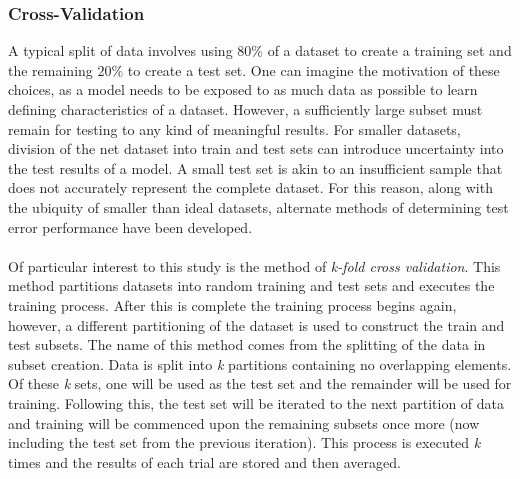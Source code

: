 \subsubsection{Cross-Validation}
A typical split of data involves using $80\%$ of a dataset to create a training set and the remaining $20\%$ to create a test set. One can imagine the motivation of these choices, as a model needs to be exposed to as much data as possible to learn defining characteristics of a dataset. However, a sufficiently large subset must remain for testing to any kind of meaningful results. For smaller datasets, division of the net dataset into train and test sets can introduce uncertainty into the test results of a model. A small test set is akin to an insufficient sample that does not accurately represent the complete dataset. For this reason, along with the ubiquity of smaller than ideal datasets, alternate methods of determining test error performance have been developed.\\ \\
Of particular interest to this study is the method of \textit{k-fold cross validation}. This method partitions datasets into random training and test sets  and executes the training process. After this is complete the training process begins again, however, a different partitioning of the dataset is used to construct the train and test subsets. The name of this method comes from the splitting of the data in subset creation. Data is split into \textit{k} partitions containing no overlapping elements. Of these \textit{k} sets, one will be used as the test set and the remainder will be used for training. Following this, the test set will be iterated to the next partition of data and training will be commenced upon the remaining subsets once more (now including the test set from the previous iteration). This process is executed \textit{k} times and the results of each trial are stored and then averaged.

